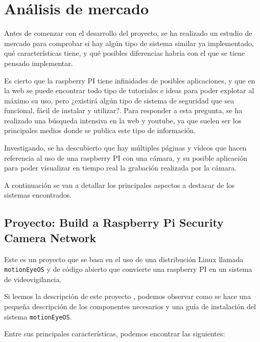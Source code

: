 


\pagestyle{miEstilo3}

\section{Análisis de mercado}

Antes de comenzar con el desarrollo del proyecto, se ha realizado un estudio de mercado para comprobar si hay algún tipo de sistema similar ya implementado, qué características tiene, y qué posibles diferencias habría con el que se tiene pensado implementar.

Es cierto que la raspberry PI tiene infinidades de posibles aplicaciones, y que en la web se puede encontrar todo tipo de tutoriales e ideas para poder explotar al máximo su uso, pero ¿existirá algún tipo de sistema de seguridad que sea funcional, fácil de instalar y utilizar?. Para responder a esta pregunta, se ha realizado una búsqueda intensiva en la web y youtube, ya que suelen ser los principales medios donde se publica este tipo de información.

Investigando, se ha descubierto que hay múltiples páginas y vídeos que hacen referencia al uso de una raspberry PI con una cámara, y su posible aplicación para poder visualizar en tiempo real la grabación realizada por la cámara.

A continuación se van a detallar los principales aspectos a destacar de los sistemas encontrados.

\subsection{Proyecto: Build a Raspberry Pi Security Camera Network} \label{sec:pj1}

Este es un proyecto \cite{ref2} que se basa en el uso de una distribución Linux llamada \texttt{motionEyeOS} y de código abierto \cite{ref3} que convierte una raspberry PI en un sistema de videovigilancia.

Si leemos la descripción de este proyecto \cite{ref2}, podemos observar como se hace una pequeña descripción de los componentes necesarios y una guía de instalación del sistema \texttt{motionEyeOS}.

Entre sus principales características, podemos encontrar las siguientes:

